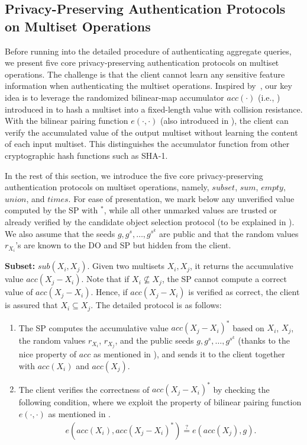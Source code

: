 \subsection{Privacy-Preserving Authentication Protocols on Multiset Operations}\label{sec:aggregate-queries:multiset-op}

Before running into the detailed procedure of authenticating aggregate queries, we present five core privacy-preserving authentication protocols on multiset operations. The challenge is that the client cannot learn any sensitive feature information when authenticating the multiset operations. Inspired by~\cite{10.1145/2660267.2660373}, our key idea is to leverage the randomized bilinear-map accumulator $acc(\cdot)$ (i.e., ) introduced in  to hash a multiset into a fixed-length value with collision resistance. With the bilinear pairing function $e(\cdot,\cdot)$ (also introduced in ), the client can verify the accumulated value of the output multiset without learning the content of each input multiset. This distinguishes the accumulator function from other cryptographic hash functions such as SHA-1.

In the rest of this section, we introduce the five core privacy-preserving authentication protocols on multiset operations, namely, $subset$, $sum$, $empty$, $union$, and $times$. For ease of presentation, we mark below any unverified value computed by the SP with $^*$, while all other unmarked values are trusted or already verified by the candidate object selection protocol (to be explained in ). We also assume that the seeds $g, g^s, \dots, g^{s^k}$ are public and that the random values $r_{X_i}$'s are known to the DO and SP but hidden from the client.

\textbf{Subset:} $sub(X_i, X_j)$.
Given two multisets $X_i, X_j$, it returns the accumulative value $acc(X_j-X_i)$. Note that if $X_i \nsubseteq X_j$, the SP cannot compute a correct value of $acc(X_j - X_i)$. Hence, if $acc(X_j-X_i)$ is verified as correct, the client is assured that $X_i \subseteq X_j$. The detailed protocol is as follows:
\begin{enumerate}
  \item The SP computes the accumulative value ${acc(X_j-X_i)}^*$ based on $X_i$, $X_j$, the random values $r_{X_i}$, $r_{X_j}$, and the public seeds $g, g^s, \dots, g^{s^k}$ (thanks to the nice property of $acc$ as mentioned in ), and sends it to the client together with $acc(X_i)$ and $acc(X_j)$.
  \item The client verifies the correctness of ${acc(X_j-X_i)}^*$ by checking the following condition, where we exploit the property of bilinear pairing function  $e(\cdot,\cdot)$ as mentioned in .
    \begin{align*}
      e(acc(X_i), {acc(X_j-X_i)}^*) \stackrel{?}{=} e(acc(X_j), g).
    \end{align*}
\end{enumerate}

